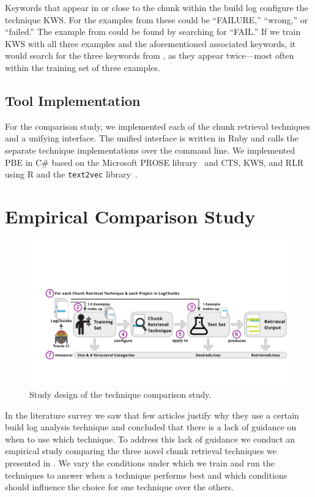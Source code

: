 Keywords that appear in or close to the chunk within
the build log configure the technique KWS\@.
For the examples from  these could be
``FAILURE,'' ``wrong,'' or ``failed.''
The example from  could be found
by searching for ``FAIL.''
If we train KWS with all three examples and the aforementioned
associated keywords, it would search for the three keywords from
, as they appear twice---most often within
the training set of three examples.

\subsection{Tool Implementation}
For the comparison study, we implemented each of the chunk retrieval
techniques and a unifying interface.
The unified interface is written in Ruby and
calls the separate technique implementations over the command line.
We implemented PBE in C\# based on the Microsoft PROSE
library~\cite{prose2019webpage} and CTS, KWS, and RLR using
R and the {\tt text2vec} library~\cite{text2vec2019webpage}.

\section{Empirical Comparison Study}
\label{sec:study}

\begin{figure}[tb]
	\centering
	\includegraphics[width=\textwidth, trim={1.6cm 2.5cm 0.2cm 4.8cm},
  clip]{img/study.pdf}
	\caption{Study design of the technique comparison study.}
	\label{fig:study}
\end{figure}

In the literature survey we saw that few articles justify why they
use a certain build log analysis technique and concluded that there
is a lack of guidance on when to use which technique.
To address this lack of guidance we conduct an empirical study
comparing the three novel chunk retrieval techniques we presented in
.
We vary the conditions under which we train and run the techniques
to answer when a technique performs best and which conditions should
influence the choice for one technique over the others.

